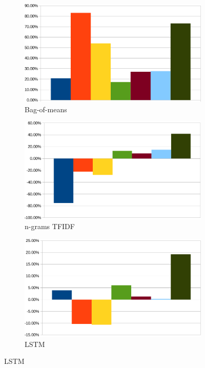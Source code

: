 \documentclass{article} %
\begin{document}
\begin{figure}[ht]
  \centering
  \begin{subfigure}[b]{0.3\textwidth}
    \includegraphics[width=\textwidth]{bom}
    \caption{Bag-of-means}
    \label{fig:bome}
  \end{subfigure}
  \begin{subfigure}[b]{0.3\textwidth}
    \includegraphics[width=\textwidth]{ngrams}
    \caption{n-grams TFIDF}
    \label{fig:ngrm}
  \end{subfigure}
  \begin{subfigure}[b]{0.3\textwidth}
    \includegraphics[width=\textwidth]{lstme}
    \caption{LSTM}
    \label{fig:lste}
  \end{subfigure}


\end{figure}
\end{document}
